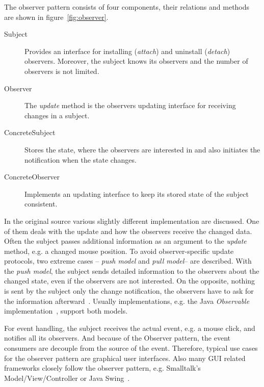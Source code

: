 \documentclass[acmsmall]{acmart}\settopmatter{printfolios=true,printccs=false,printacmref=false}
\begin{document}
	The observer pattern consists of four components, their relations and methods are shown in figure~\ref{fig:observer}.

	\begin{description}
		\item[Subject] Provides an interface for installing (\textit{attach}) and uninstall (\textit{detach}) observers. 
		Moreover, the subject knows its observers and the number of observers is not limited.
		\item[Observer] The \textit{update} method is the observers updating interface for receiving changes in a subject.
		\item[ConcreteSubject] Stores the state, where the observers are interested in and also initiates the notification when the state changes.
		\item[ConcreteObserver] Implements an updating interface to keep its stored state of the subject consistent. 
	\end{description}

	In the original source various slightly different implementation are discussed. 
	One of them deals with the update and how the observers receive the changed data. 
	Often the subject passes additional information as an argument to the \textit{update} method, e.g. a changed mouse position. 
	To avoid observer-specific update protocols, two extreme cases -- \textit{push model} and \textit{pull model}-- are described.
	With the \textit{push model}, the subject sends detailed information to the observers about the changed state, even if the observers are not interested. 
	On the opposite, nothing is sent by the subject only the change notification, the observers have to ask for the information afterward~\cite{Gamma:1995}.
	Usually implementations, e.g. the Java \textit{Observable} implementation~\cite{oracleObservable}, support both models.

	For event handling, the subject receives the actual event, e.g. a mouse click, and notifies all its observers.
	And because of the Observer pattern, the event consumers are decouple from the source of the event. 
	Therefore, typical use cases for the observer pattern are graphical user interfaces.
	Also many GUI related frameworks closely follow the observer pattern, e.g. Smalltalk's Model/View/Controller or Java Swing~\cite{Gamma:1995,Maier:2010}.
\end{document}
